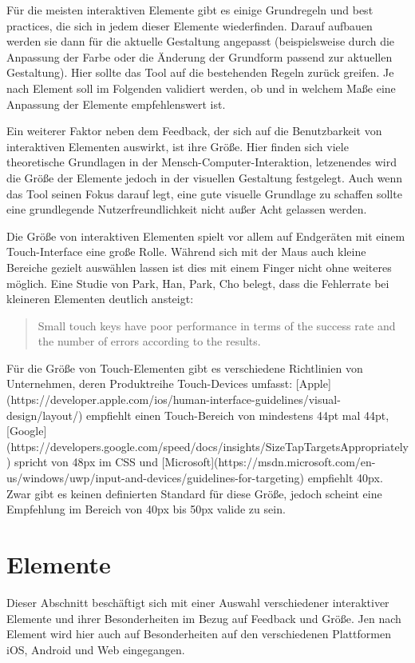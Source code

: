 Für die meisten interaktiven Elemente gibt es einige Grundregeln und best practices, die sich in jedem dieser Elemente wiederfinden. Darauf aufbauen werden sie dann für die aktuelle Gestaltung angepasst (beispielsweise durch die Anpassung der Farbe oder die Änderung der Grundform passend zur aktuellen Gestaltung).
Hier sollte das Tool auf die bestehenden Regeln zurück greifen. Je nach Element soll im Folgenden validiert werden, ob und in welchem Maße eine Anpassung der Elemente empfehlenswert ist.

Ein weiterer Faktor neben dem Feedback, der sich auf die Benutzbarkeit von interaktiven Elementen auswirkt, ist ihre Größe. Hier finden sich viele theoretische Grundlagen in der Mensch-Computer-Interaktion, letzenendes wird die Größe der Elemente jedoch in der visuellen Gestaltung festgelegt. Auch wenn das Tool seinen Fokus darauf legt, eine gute visuelle Grundlage zu schaffen sollte eine grundlegende Nutzerfreundlichkeit nicht außer Acht gelassen werden.

Die Größe von interaktiven Elementen spielt vor allem auf Endgeräten mit einem Touch-Interface eine große Rolle. Während sich mit der Maus auch kleine Bereiche gezielt auswählen lassen ist dies mit einem Finger nicht ohne weiteres möglich.
Eine Studie von Park, Han, Park, Cho belegt, dass die Fehlerrate bei kleineren Elementen deutlich ansteigt:

\begin{quote}
Small touch keys have poor performance in terms of the success rate and the number of errors according to the results.
\end{quote}

Für die Größe von Touch-Elementen gibt es verschiedene Richtlinien von Unternehmen, deren Produktreihe Touch-Devices umfasst:
[Apple](https://developer.apple.com/ios/human-interface-guidelines/visual-design/layout/) empfiehlt einen Touch-Bereich von mindestens 44pt mal 44pt, [Google](https://developers.google.com/speed/docs/insights/SizeTapTargetsAppropriately) spricht von 48px im CSS und [Microsoft](https://msdn.microsoft.com/en-us/windows/uwp/input-and-devices/guidelines-for-targeting) empfiehlt 40px.  Zwar gibt es keinen definierten Standard für diese Größe, jedoch scheint eine Empfehlung im Bereich von 40px bis 50px valide zu sein.

\section{Elemente}
Dieser Abschnitt beschäftigt sich mit einer Auswahl verschiedener interaktiver Elemente und ihrer Besonderheiten im Bezug auf Feedback und Größe.
Jen nach Element wird hier auch auf Besonderheiten auf den verschiedenen Plattformen iOS, Android und Web eingegangen.

